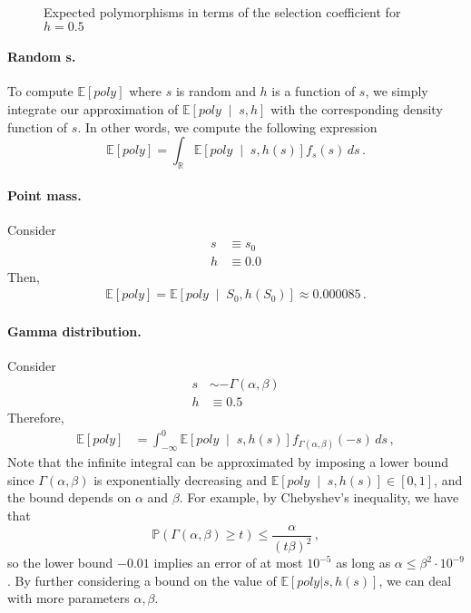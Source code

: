 \documentclass[a4paper,11pt]{article}
\newcommand{\EE}{\mathbb{E}}
\newcommand{\PP}{\mathbb{P}}
\newcommand{\RR}{\mathbb{R}}
\newcommand{\1}{\mathds{1}}
\newcommand{\cond}{\;\middle\vert\;}
\theoremstyle{plain} %
\theoremstyle{definition} %
\theoremstyle{remark} %
\begin{document}
\begin{figure}[h]
	\caption{Expected polymorphisms in terms of the selection coefficient for $h = 0.5$}
	\label{Figure: Epected poly given s for h = 0.5}
\end{figure}

\paragraph{Random s.}
To compute $\EE[poly]$ where $s$ is random and $h$ is a function of $s$, we simply integrate our approximation of $\EE \left[ poly \cond s, h \right]$ with the corresponding density function of $s$. 
In other words, we compute the following expression
\[
	\EE \left[ poly \right] = \int_{\RR} \EE \left[ poly \cond s, h(s) \right] f_s(s) \, ds \,.
\]

\paragraph{Point mass.}
Consider
\begin{align*}
	s &\equiv s_0 \\
	h &\equiv 0.0
\end{align*}
Then, 
\begin{align*}
	\EE[poly] 
		= \EE \left[ poly \cond S_0, h(S_0) \right]
		\approx 0.000085 \,.
\end{align*}



\paragraph{Gamma distribution.}
Consider 
\begin{align*}
	s &\sim -\Gamma(\alpha, \beta) \\
	h &\equiv 0.5
\end{align*}
Therefore, 
\begin{align*}
	\EE[poly] 
		&= \int_{-\infty}^{0} \EE \left[ poly \cond s, h(s) \right] f_{\Gamma(\alpha, \beta)}(-s) \, ds \,,
\end{align*}
Note that the infinite integral can be approximated by imposing a lower bound since $\Gamma(\alpha, \beta)$ is exponentially decreasing and $\EE \left[ poly \cond s, h(s) \right] \in [0, 1]$, and the bound depends on $\alpha$ and $\beta$.
For example, by Chebyshev's inequality, we have that
\[
	\PP( \Gamma(\alpha, \beta) \ge t ) \le \frac{\alpha}{(t \beta)^2} \,, 
\]
so the lower bound $-0.01$ implies an error of at most $10^{-5}$ as long as $\alpha \le \beta^2 \cdot 10^{-9}$.
By further considering a bound on the value of $\EE [poly | s, h(s)]$, we can deal with more parameters $\alpha, \beta$.
\end{document}

